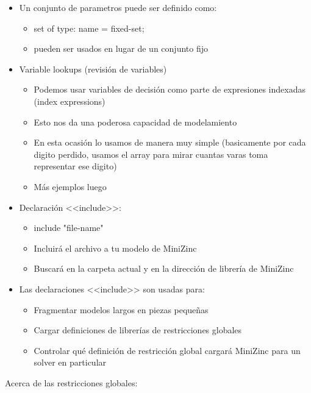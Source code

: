 \documentclass[12pt]{article}
\begin{document}
\begin{itemize}
\item Un conjunto de parametros puede ser definido como:
\begin{itemize}
\item set of type: name = fixed-set;
\item pueden ser usados en lugar de un conjunto fijo
\end{itemize}
\item Variable lookups (revisión de variables)
\begin{itemize}
\item Podemos usar variables de decisión como parte de expresiones indexadas (index expressions)
\item Esto nos da una poderosa capacidad de modelamiento
\item En esta ocasión lo usamos de manera muy simple (basicamente por cada digito perdido, usamos el array para mirar cuantas varas toma representar ese digito)
\item Más ejemplos luego
\end{itemize}
\item Declaración <<include>>:
\begin{itemize}
\item include "file-name"
\item Incluirá el archivo a tu modelo de MiniZinc
\item Buscará en la carpeta actual y en la dirección de librería de MiniZinc
\end{itemize}
\item Las declaraciones <<include>> son usadas para:
\begin{itemize}
\item Fragmentar modelos largos en piezas pequeñas
\item Cargar definiciones de librerías de restricciones globales
\item Controlar qué definición de restricción global cargará MiniZinc para un solver en particular
\end{itemize}
\end{itemize}

\begin{justify}
Acerca de las restricciones globales:
\end{justify}
\end{document}
